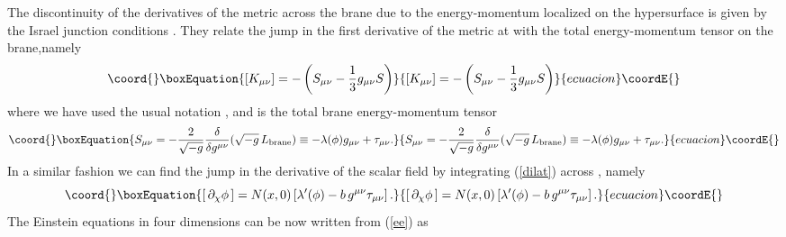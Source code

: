 \documentclass[prd,a4paper,twocolumn,superscriptaddress,nofootinbib,showpacs]{revtex4}
\begin{document}
The discontinuity of the derivatives of the metric across the brane due to the energy-momentum 
localized on the hypersurface \coordHE{} is given by the Israel junction conditions 
\cite{is,sms}. They relate the jump in the first derivative of the metric at \coordHE{} with the 
total energy-momentum tensor on the brane,namely
\begin{equation}\coord{}\boxEquation{
\left[K_{\mu\nu}\right]=-\left(S_{\mu\nu}-{1 \over 3}g_{\mu\nu}S\right)
\label{sk}
}{
\left[K_{\mu\nu}\right]=-\left(S_{\mu\nu}-{1 \over 3}g_{\mu\nu}S\right)
}{ecuacion}\coordE{}\end{equation}
where we have used the usual notation \coordHE{}, and
 \coordHE{} is the total brane energy-momentum tensor 
\begin{equation}\coord{}\boxEquation{
S_{\mu\nu}=-{2\over \sqrt{-g}}{\delta\over \delta g^{\mu\nu}}(\sqrt{-g}\,L_{\rm brane})
\equiv -\lambda(\phi)g_{\mu\nu}+\tau_{\mu\nu}.
\label{s}
}{
S_{\mu\nu}=-{2\over \sqrt{-g}}{\delta\over \delta g^{\mu\nu}}(\sqrt{-g}\,L_{\rm brane})
\equiv -\lambda(\phi)g_{\mu\nu}+\tau_{\mu\nu}.
}{ecuacion}\coordE{}\end{equation}
In a similar fashion we can find the jump in the derivative of the scalar field  
by integrating (\ref{dilat}) across \coordHE{}, namely
\begin{equation}\coord{}\boxEquation{
\left[\,\partial_{\chi}\phi\,\right]
= N(x,0)\left[\lambda'(\phi)-
b\,g^{\mu\nu}\tau_{\mu\nu}\right].
\label{matdil}
}{
\left[\,\partial_{\chi}\phi\,\right]
= N(x,0)\left[\lambda'(\phi)-
b\,g^{\mu\nu}\tau_{\mu\nu}\right].
}{ecuacion}\coordE{}\end{equation}
The Einstein equations in four dimensions can be now written from
(\ref{ee}) as
\end{document}

